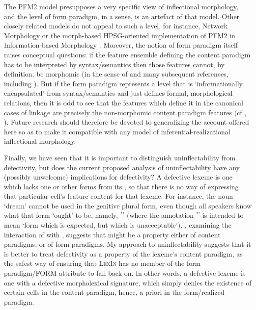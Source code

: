 \documentclass[output=paper,colorlinks,citecolor=brown]{langscibook}
\begin{document}
The PFM2 model presupposes a very specific view of inflectional morphology, and the level of form paradigm, in a sense, is an artefact of that model. Other closely related models do not appeal to such a level, for instance, Network Morphology \citep{brownhippisley2012} or the morph-based HPSG-oriented implementation of PFM2 in Information-based Morphology \citep{crysmannbonami2016}. Moreover, the notion of form paradigm itself raises conceptual questions: if the feature ensemble defining the content paradigm has to be interpreted by syntax/semantics then those features cannot, by definition, be morphomic (in the sense of \citealp{aronoff1994} and many subsequent references, including \citealp{stump2016}). But if the form paradigm represents a level that is `informationally encapsulated' from syntax/semantics and just defines formal, morphological relations, then it is odd to see that the features which define it in the canonical cases of linkage are precisely the non-morphomic content paradigm features (cf \citealp{boyeschalchli2019}, \citealp{spencer2021}). Future research should therefore be devoted to generalizing the account offered here so as to make it compatible with any model of inferential-realizational inflectional morphology.

Finally, we have seen that it is important to distinguish uninflectability from defectivity, but does the current proposed analysis of uninflectability have any (possibly unwelcome) implications for defectivity? A defective lexeme is one which lacks one or other forms from its , so that there is no way of expressing that particular cell's feature content for that lexeme. For instance, the  noun  `dream' cannot be used in the genitive plural form, even though all  speakers know what that form `ought' to be, namely, $^{*!}$ (where the annotation $^{*!}$ is intended to mean `form which is expected, but which is unacceptable'). \citet{stump2010}, examining the interaction of  with , suggests that  might be a property either of content paradigms, or of form paradigms. 
My approach to uninflectability suggests that it is better to treat defectivity as a property of the lexeme's content paradigm, as the safest way of ensuring that \textsc{LexIn} has no member of the form paradigm/FORM attribute to fall back on. In other words, a defective lexeme is one with a defective morpholexical signature, which simply denies the existence of certain cells in the content paradigm, hence, a priori in the form/realized paradigm.
 
\end{document}
